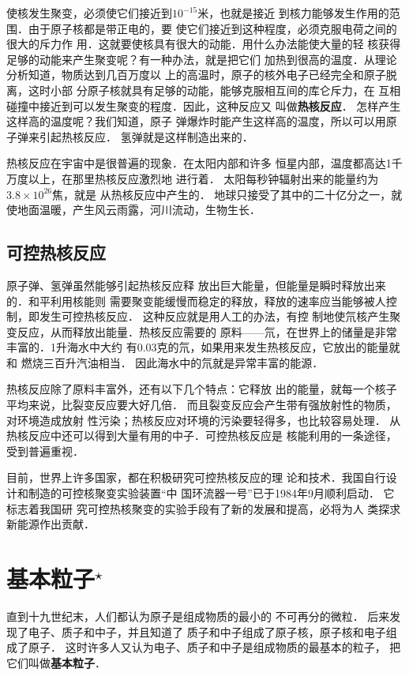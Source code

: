 使核发生聚变，必须使它们接近到$10^{-15}$米，也就是接近
到核力能够发生作用的范围．由于原子核都是带正电的，要
使它们接近到这种程度，必须克服电荷之间的很大的斥力作
用．这就要使核具有很大的动能．用什么办法能使大量的轻
核获得足够的动能来产生聚变呢？有一种办法，就是把它们
加热到很高的温度．从理论分析知道，物质达到几百万度以
上的高温时，原子的核外电子已经完全和原子脱离，这时小部
分原子核就具有足够的动能，能够克服相互间的库仑斥力，在
互相碰撞中接近到可以发生聚变的程度．因此，这种反应又
叫做\textbf{热核反应}．
怎样产生这样高的温度呢？我们知道，原子
弹爆炸时能产生这样高的温度，所以可以用原子弹来引起热核反应．
氢弹就是这样制造出来的．

热核反应在宇宙中是很普遍的现象．在太阳内部和许多
恒星内部，温度都高达1千万度以上，在那里热核反应激烈地
进行着．
太阳每秒钟辐射出来的能量约为$3.8\times10^{26}$焦，就是
从热核反应中产生的．
地球只接受了其中的二十亿分之一，就
使地面温暖，产生风云雨露，河川流动，生物生长．

\subsection{可控热核反应}

原子弹、氢弹虽然能够引起热核反应释
放出巨大能量，但能量是瞬时释放出来的．和平利用核能则
需要聚变能缓慢而稳定的释放，释放的速率应当能够被人控
制，即发生可控热核反应．
这种反应就是用人工的办法，有控
制地使氘核产生聚变反应，从而释放出能量．热核反应需要的
原料——氘，在世界上的储量是非常丰富的．1升海水中大约
有0.03克的氘，如果用来发生热核反应，它放出的能量就和
燃烧三百升汽油相当．
因此海水中的氘就是异常丰富的能源．

热核反应除了原料丰富外，还有以下几个特点：它释放
出的能量，就每一个核子平均来说，比裂变反应要大好几倍．
而且裂变反应会产生带有强放射性的物质，对环境造成放射
性污染；热核反应对环境的污染要轻得多，也比较容易处理．
从热核反应中还可以得到大量有用的中子．可控热核反应是
核能利用的一条途径，受到普遍重视．

目前，世界上许多国家，都在积极研究可控热核反应的理
论和技术．我国自行设计和制造的可控核聚变实验装置“中
国环流器一号”已于1984年9月顺利启动．
它标志着我国研
究可控热核聚变的实验手段有了新的发展和提高，必将为人
类探求新能源作出贡献．

\section{基本粒子$^\star$}\label{sec_C_9-8}

直到十九世纪末，人们都认为原子是组成物质的最小的
不可再分的微粒．
后来发现了电子、质子和中子，并且知道了
质子和中子组成了原子核，原子核和电子组成了原子．
这时许多人又认为电子、质子和中子是组成物质的最基本的粒子，
把它们叫做\textbf{基本粒子}．

